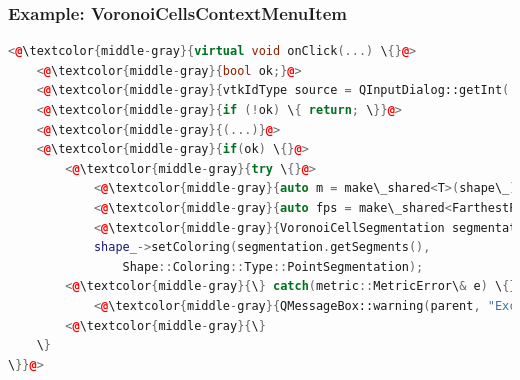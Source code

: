 \documentclass[compress]{beamer}
\begin{document}
\begin{frame}[fragile]
  \frametitle{Example: VoronoiCellsContextMenuItem}
  
\begin{lstlisting}[language=C++, keywordstyle=\color{blue},
                stringstyle=\color{red},
                commentstyle=\color{green}, numbers=none]
<@\textcolor{middle-gray}{virtual void onClick(...) \{}@>
    <@\textcolor{middle-gray}{bool ok;}@>
    <@\textcolor{middle-gray}{vtkIdType source = QInputDialog::getInt(...);}@>
    <@\textcolor{middle-gray}{if (!ok) \{ return; \}}@>
    <@\textcolor{middle-gray}{(...)}@>
    <@\textcolor{middle-gray}{if(ok) \{}@>
        <@\textcolor{middle-gray}{try \{}@>
            <@\textcolor{middle-gray}{auto m = make\_shared<T>(shape\_);}@>
            <@\textcolor{middle-gray}{auto fps = make\_shared<FarthestPointSampling>(shape\_, m, source, numberOfSegments);}@>
            <@\textcolor{middle-gray}{VoronoiCellSegmentation segmentation(shape\_, m, fps);}@>
            shape_->setColoring(segmentation.getSegments(), 
            	Shape::Coloring::Type::PointSegmentation);
        <@\textcolor{middle-gray}{\} catch(metric::MetricError\& e) \{}@>
            <@\textcolor{middle-gray}{QMessageBox::warning(parent, "Exception", e.what());}@>
        <@\textcolor{middle-gray}{\}
    \}
\}}@>
\end{lstlisting}

\end{frame}
\end{document}

